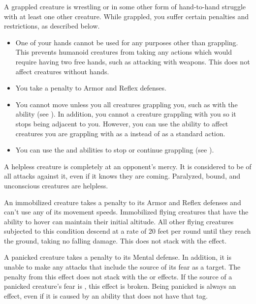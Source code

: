      A grappled creature is wrestling or in some other form of hand-to-hand struggle with at least one other creature.
    While grappled, you suffer certain penalties and restrictions, as described below.
    \begin{itemize}
        \item One of your hands cannot be used for any purposes other than grappling.
            This prevents humanoid creatures from taking any actions which would require having two free hands, such as attacking with  weapons.
            This does not affect creatures without hands.
        \item You take a  penalty to Armor and Reflex defenses.
        \item You cannot move unless you  all creatures grappling you, such as with the  ability (see ).
            In addition, you cannot  a creature grappling with you so it stops being adjacent to you.
            However, you can use the  ability to affect creatures you are grappling with as a  instead of as a standard action.
        \item You can use the  and  abilities to stop or continue grappling (see ).
    \end{itemize}

     A helpless creature is completely at an opponent's mercy.
    It is considered to be \unaware of all attacks against it, even if it knows they are coming.
    Paralyzed, bound, and unconscious creatures are helpless.

     An immobilized creature takes a  penalty to its Armor and Reflex defenses and can't use any of its movement speeds.
    Immobilized flying creatures that have the ability to hover can maintain their initial altitude.
    All other flying creatures subjected to this condition descend at a rate of 20 feet per round until they reach the ground, taking no falling damage.
    This does not stack with the \slowed effect.

     A panicked creature takes a  penalty to its Mental defense.
    In addition, it is unable to make any attacks that include the source of its fear as a target.
    The penalty from this effect does not stack with the \frightened or \panicked effects.
    If the source of a panicked creature's fear is , this effect is broken.
    Being panicked is always an  effect, even if it is caused by an ability that does not have that tag.


